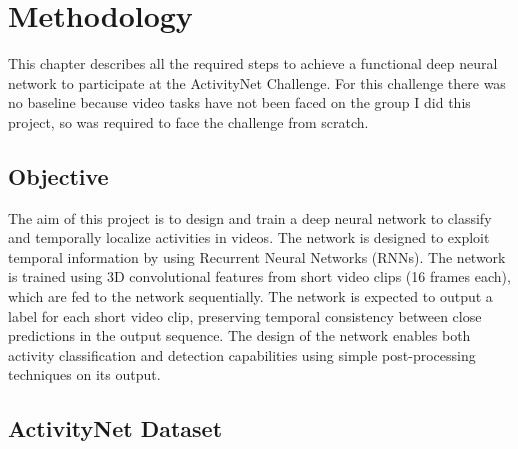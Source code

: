 \chapter{Methodology}

This chapter describes all the required steps to achieve a functional deep neural network to participate at the ActivityNet Challenge. For this challenge there was no baseline because video tasks have not been faced on the group I did this project, so was required to face the challenge from scratch.


\section{Objective}

The aim of this project is to design and train a deep neural network to classify and temporally localize activities in videos. The network is designed to exploit temporal information by using Recurrent Neural Networks (RNNs). The network is trained using 3D convolutional features from short video clips (16 frames each), which are fed to the network sequentially. The network is expected to output a label for each short video clip, preserving temporal consistency between close predictions in the output sequence. The design of the network enables both activity classification and detection capabilities using simple post-processing techniques on its output.




\section{ActivityNet Dataset}

